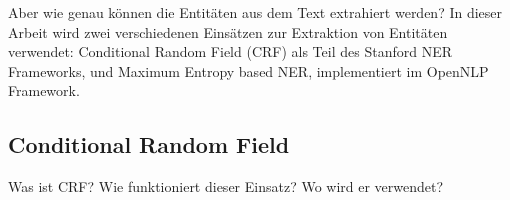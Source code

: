 Aber wie genau können die Entitäten aus dem Text extrahiert werden? In dieser Arbeit wird zwei verschiedenen Einsätzen zur Extraktion von Entitäten verwendet: Conditional Random Field (CRF) als Teil des Stanford NER Frameworks, und Maximum Entropy based NER, implementiert im OpenNLP Framework.

\subsection{Conditional Random Field}
Was ist CRF? Wie funktioniert dieser Einsatz? Wo wird er verwendet?



